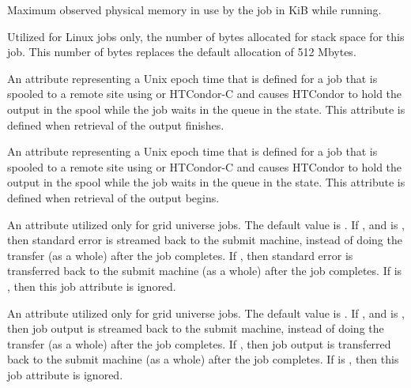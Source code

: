 \begin{description}
\item[\AdAttr{ResidentSetSize}:]  Maximum observed
physical memory in use by the job in KiB while running.

\item[\AdAttr{StackSize}:]   
Utilized for Linux jobs only, 
the number of bytes allocated for stack space for this job.
This number of bytes replaces the default allocation of 512 Mbytes.

\item[\AdAttr{StageOutFinish}:]   
An attribute representing a Unix epoch time that is defined for a job that is
spooled to a remote site using  or HTCondor-C
and causes HTCondor to hold the output in the spool while the job waits 
in the queue in the  state.
This attribute is defined when retrieval of the output finishes.

\item[\AdAttr{StageOutStart}:]   
An attribute representing a Unix epoch time that is defined for a job that is
spooled to a remote site using  or HTCondor-C
and causes HTCondor to hold the output in the spool while the job waits 
in the queue in the  state.
This attribute is defined when retrieval of the output begins.

\item[\AdAttr{StreamErr}:]   
An attribute utilized only for grid universe jobs.
The default value is .
If , and  is , then 
standard error is streamed back to the submit machine, instead
of doing the transfer (as a whole) after the job completes.
If , then
standard error is transferred back to the submit machine
(as a whole) after the job completes.
If  is , then this job attribute is ignored.

\item[\AdAttr{StreamOut}:]   
An attribute utilized only for grid universe jobs.
The default value is .
If , and  is , then 
job output is streamed back to the submit machine, instead
of doing the transfer (as a whole) after the job completes.
If , then
job output is transferred back to the submit machine
(as a whole) after the job completes.
If  is , then this job attribute is ignored.


\end{description}
